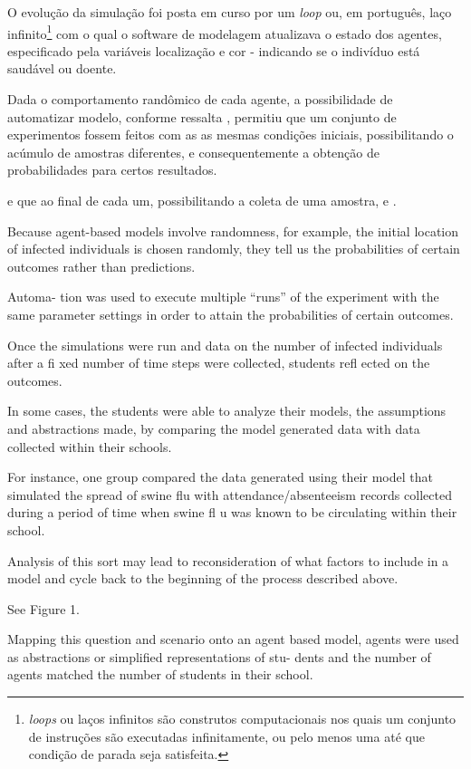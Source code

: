 O evolução da simulação foi posta em curso por um \textit{loop} ou, em português, laço infinito\footnote{\textit{loops} ou laços infinitos são construtos computacionais nos quais um conjunto de instruções são executadas infinitamente, ou pelo menos uma até que condição de parada seja satisfeita.} com o qual o software de modelagem atualizava o estado dos agentes, especificado pela variáveis localização e cor - indicando se o indivíduo está saudável ou doente. 

Dada o comportamento randômico de cada agente, a possibilidade de automatizar modelo, conforme ressalta , permitiu que um conjunto de experimentos fossem feitos com as as mesmas condições iniciais, possibilitando o acúmulo de amostras diferentes, e consequentemente a obtenção de probabilidades para certos resultados. 






e que ao final de cada um, possibilitando a coleta de uma amostra, e .



Because agent-based models involve randomness, for example, the initial location of infected individuals is chosen randomly, they tell us the probabilities of certain outcomes rather than predictions.

Automa- tion was used to execute multiple “runs” of the experiment with the same parameter settings in order to attain the probabilities of certain outcomes.

Once the simulations were run and data on the number of infected individuals after a fi xed number of time steps were collected, students refl ected on the outcomes.

In some cases, the students were able to analyze their models, the assumptions and abstractions made, by comparing the model generated data with data collected within their schools.

For instance, one group compared the data generated using their model that simulated the spread of swine flu with attendance/absenteeism records collected during a period of time when swine fl u was known to be circulating within their school.

Analysis of this sort may lead to reconsideration of what factors to include in a model and cycle back to the beginning of the process described above.

See Figure 1.

Mapping this question and scenario onto an agent based model, agents were used as abstractions or simplified representations of stu- dents and the number of agents matched the number of students in their school.

